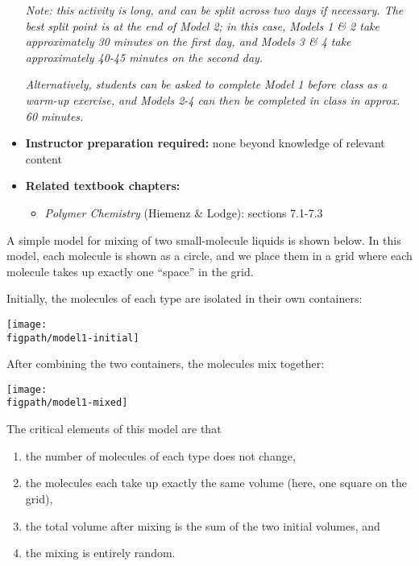 \begin{activity}
\begin{instructornotes}
\begin{itemize}
			\emph{Note: this activity is long, and can be split across two days if necessary.  The best split point is at the end of Model 2; in this case, Models 1 \& 2 take approximately 30 minutes on the first day, and Models 3 \& 4 take approximately 40-45 minutes on the second day.}
			
			\emph{Alternatively, students can be asked to complete Model 1 before class as a warm-up exercise, and Models 2-4 can then be completed in class in approx. 60 minutes.}
		\item \textbf{Instructor preparation required:} none beyond knowledge of relevant content
		\item \textbf{Related textbook chapters:}
			\begin{itemize}
				\item \emph{Polymer Chemistry} (Hiemenz \& Lodge): sections 7.1-7.3
		\end{itemize}
	\end{itemize}

\end{instructornotes}


\begin{model}
\label{\labelbase:mdl:idealtoy}

A simple model for mixing of two small-molecule liquids is shown below.  In this model, each molecule is shown as a circle, and we place them in a grid where each molecule takes up exactly one ``space'' in the grid.

Initially, the molecules of each type are isolated in their own containers:

\centerline{\texttt{[image: \\figpath/model1-initial]}}

After combining the two containers, the molecules mix together:

\vspace{6pt}
\centerline{\texttt{[image: \\figpath/model1-mixed]}}

The critical elements of this model are that
\begin{enumerate}[itemsep=0pt,topsep=-6pt]
	\item the number of molecules of each type does not change,
	\item the molecules each take up exactly the same volume (here, one square on the grid),
	\item the total volume after mixing is the sum of the two initial volumes, and
	\item the mixing is entirely random.
\end{enumerate}


\end{model}
\end{activity}

